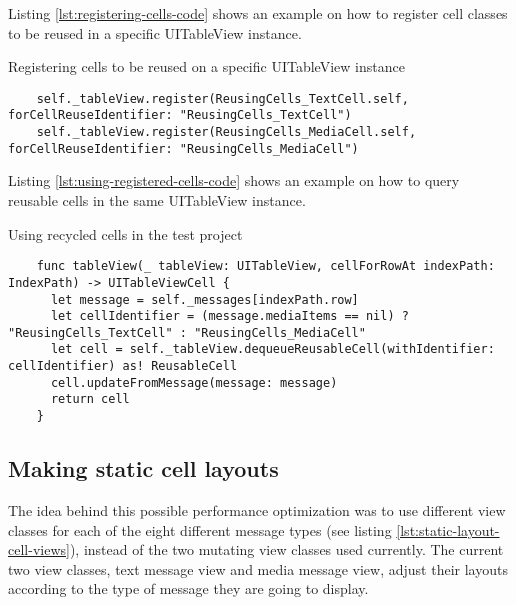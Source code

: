 \documentclass[a4paper,12pt]{article}
\begin{document}
Listing \autoref{lst:registering-cells-code} shows an example on how to register cell classes to be reused in a specific UITableView instance.
\begin{listing}[H]
  \caption{Registering cells to be reused on a specific UITableView instance}
  \label{lst:registering-cells-code}
  \begin{verbatim}
    self._tableView.register(ReusingCells_TextCell.self, forCellReuseIdentifier: "ReusingCells_TextCell")
    self._tableView.register(ReusingCells_MediaCell.self, forCellReuseIdentifier: "ReusingCells_MediaCell")
  \end{verbatim}
\end{listing}

Listing \autoref{lst:using-registered-cells-code} shows an example on how to query reusable cells in the same UITableView instance.
\begin{listing}[H]
  \caption{Using recycled cells in the test project}
  \label{lst:using-registered-cells-code}
  \begin{verbatim}
    func tableView(_ tableView: UITableView, cellForRowAt indexPath: IndexPath) -> UITableViewCell {
      let message = self._messages[indexPath.row]
      let cellIdentifier = (message.mediaItems == nil) ? "ReusingCells_TextCell" : "ReusingCells_MediaCell"
      let cell = self._tableView.dequeueReusableCell(withIdentifier: cellIdentifier) as! ReusableCell
      cell.updateFromMessage(message: message)
      return cell
    }
  \end{verbatim}
\end{listing}

\subsection{Making static cell layouts}
\label{subsec:making-static-cell-layouts}
The idea behind this possible performance optimization was to use different view classes for each of the eight different message types (see listing \autoref{lst:static-layout-cell-views}), instead of the two mutating view classes used currently. The current two view classes, text message view and media message view, adjust their layouts according to the type of message they are going to display.
\end{document}
